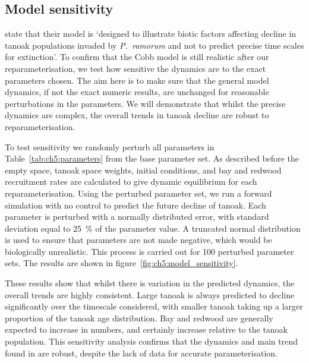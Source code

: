 \subsection{Model sensitivity\label{sec:ch5:model_sensitivity}}

\citet{cobb_ecosystem_2012} state that their model is `designed to illustrate biotic factors affecting decline in tanoak populations invaded by \emph{P.~ramorum} and not to predict precise time scales for extinction'. To confirm that the Cobb model is still realistic after our reparameterisation, we test how sensitive the dynamics are to the exact parameters chosen. The aim here is to make sure that the general model dynamics, if not the exact numeric results, are unchanged for reasonable perturbations in the parameters. We will demonstrate that whilst the precise dynamics are complex, the overall trends in tanoak decline are robust to reparameterisation.

To test sensitivity we randomly perturb all parameters in Table~\ref{tab:ch5:parameters} from the base parameter set. As described before the empty space, tanoak space weights, initial conditions, and bay and redwood recruitment rates are calculated to give dynamic equilibrium for each reparameterisation. Using the perturbed parameter set, we run a forward simulation with no control to predict the future decline of tanoak. Each parameter is perturbed with a normally distributed error, with standard deviation equal to \SI{25}{\percent} of the parameter value. A truncated normal distribution is used to ensure that parameters are not made negative, which would be biologically unrealistic. This process is carried out for 100 perturbed parameter sets. The results are shown in figure~\ref{fig:ch5:model_sensitivity}.

These results show that whilst there is variation in the predicted dynamics, the overall trends are highly consistent. Large tanoak is always predicted to decline significantly over the timescale considered, with smaller tanoak taking up a larger proportion of the tanoak age distribution. Bay and redwood are generally expected to increase in numbers, and certainly increase relative to the tanoak population. This sensitivity analysis confirms that the dynamics and main trend found in \citet{cobb_ecosystem_2012} are robust, despite the lack of data for accurate parameterisation.

